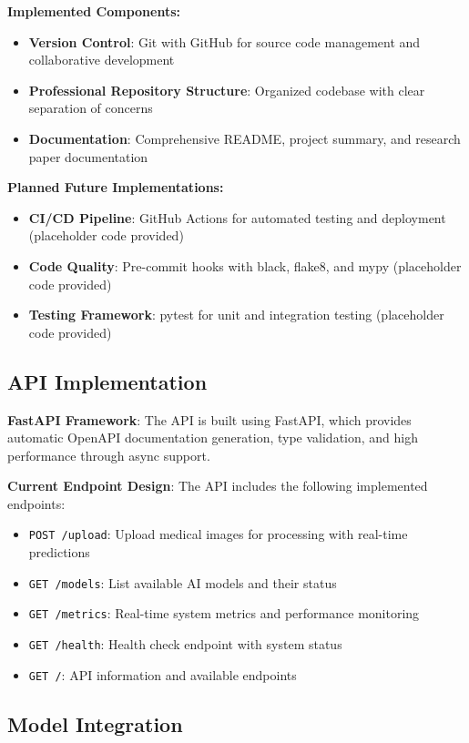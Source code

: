 \documentclass[12pt,a4paper]{article}
\begin{document}
\textbf{Implemented Components:}
\begin{itemize}
    \item \textbf{Version Control}: Git with GitHub for source code management and collaborative development
    \item \textbf{Professional Repository Structure}: Organized codebase with clear separation of concerns
    \item \textbf{Documentation}: Comprehensive README, project summary, and research paper documentation
\end{itemize}

\textbf{Planned Future Implementations:}
\begin{itemize}
    \item \textbf{CI/CD Pipeline}: GitHub Actions for automated testing and deployment (placeholder code provided)
    \item \textbf{Code Quality}: Pre-commit hooks with black, flake8, and mypy (placeholder code provided)
    \item \textbf{Testing Framework}: pytest for unit and integration testing (placeholder code provided)
\end{itemize}

\subsection{API Implementation}

\textbf{FastAPI Framework}: The API is built using FastAPI, which provides automatic OpenAPI documentation generation, type validation, and high performance through async support.

\textbf{Current Endpoint Design}: The API includes the following implemented endpoints:

\begin{itemize}
    \item \texttt{POST /upload}: Upload medical images for processing with real-time predictions
    \item \texttt{GET /models}: List available AI models and their status
    \item \texttt{GET /metrics}: Real-time system metrics and performance monitoring
    \item \texttt{GET /health}: Health check endpoint with system status
    \item \texttt{GET /}: API information and available endpoints
\end{itemize}

\subsection{Model Integration}
\end{document}
